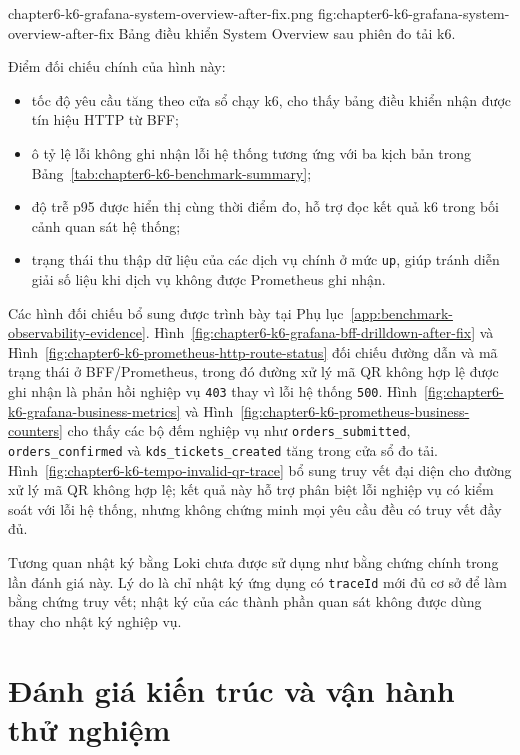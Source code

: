   {chapter6-k6-grafana-system-overview-after-fix.png}
  {fig:chapter6-k6-grafana-system-overview-after-fix}
  {Bảng điều khiển System Overview sau phiên đo tải k6.}
\FloatBarrier

Điểm đối chiếu chính của hình này:
\begin{itemize}
  \item tốc độ yêu cầu tăng theo cửa sổ chạy k6, cho thấy bảng điều khiển nhận được tín hiệu HTTP từ BFF;
  \item ô tỷ lệ lỗi không ghi nhận lỗi hệ thống tương ứng với ba kịch bản trong Bảng~\ref{tab:chapter6-k6-benchmark-summary};
  \item độ trễ p95 được hiển thị cùng thời điểm đo, hỗ trợ đọc kết quả k6 trong bối cảnh quan sát hệ thống;
  \item trạng thái thu thập dữ liệu của các dịch vụ chính ở mức \texttt{up}, giúp tránh diễn giải số liệu khi dịch vụ không được Prometheus ghi nhận.
\end{itemize}

Các hình đối chiếu bổ sung được trình bày tại Phụ lục~\ref{app:benchmark-observability-evidence}. Hình~\ref{fig:chapter6-k6-grafana-bff-drilldown-after-fix} và Hình~\ref{fig:chapter6-k6-prometheus-http-route-status} đối chiếu đường dẫn và mã trạng thái ở BFF/Prometheus, trong đó đường xử lý mã QR không hợp lệ được ghi nhận là phản hồi nghiệp vụ \texttt{403} thay vì lỗi hệ thống \texttt{500}. Hình~\ref{fig:chapter6-k6-grafana-business-metrics} và Hình~\ref{fig:chapter6-k6-prometheus-business-counters} cho thấy các bộ đếm nghiệp vụ như \texttt{orders\_submitted}, \texttt{orders\_confirmed} và \texttt{kds\_tickets\_created} tăng trong cửa sổ đo tải. Hình~\ref{fig:chapter6-k6-tempo-invalid-qr-trace} bổ sung truy vết đại diện cho đường xử lý mã QR không hợp lệ; kết quả này hỗ trợ phân biệt lỗi nghiệp vụ có kiểm soát với lỗi hệ thống, nhưng không chứng minh mọi yêu cầu đều có truy vết đầy đủ.

Tương quan nhật ký bằng Loki chưa được sử dụng như bằng chứng chính trong lần đánh giá này. Lý do là chỉ nhật ký ứng dụng có \texttt{traceId} mới đủ cơ sở để làm bằng chứng truy vết; nhật ký của các thành phần quan sát không được dùng thay cho nhật ký nghiệp vụ.

\section{Đánh giá kiến trúc và vận hành thử nghiệm}

